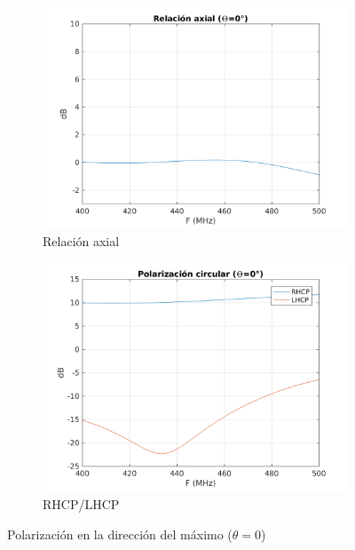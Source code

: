 \documentclass[12pt]{article}
\begin{document}
\begin{figure}[!h]
	\centering
	\begin{subfigure}{.45\textwidth}
		\centering
		\includegraphics[width=1.1\linewidth]{helix_1_THETA0_AR.png}
		\caption{Relación axial}
	\end{subfigure}%
	\begin{subfigure}{.45\textwidth}
		\centering
		\includegraphics[width=1.1\linewidth]{helix_1_THETA0_CP.png}
		\caption{RHCP/LHCP}
	\end{subfigure}
	\caption{Polarización en la dirección del máximo ($\theta=0$)}
\end{figure}
\end{document}
